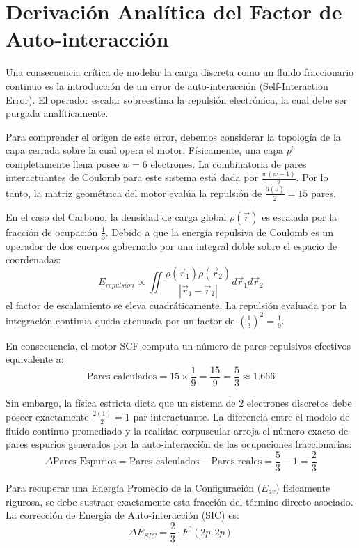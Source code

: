 \documentclass[11pt, a4paper]{article}
\begin{document}
\section{Derivación Analítica del Factor de Auto-interacción}
Una consecuencia crítica de modelar la carga discreta como un fluido fraccionario continuo es la introducción de un error de auto-interacción (Self-Interaction Error). El operador escalar sobreestima la repulsión electrónica, la cual debe ser purgada analíticamente.

Para comprender el origen de este error, debemos considerar la topología de la capa cerrada sobre la cual opera el motor. Físicamente, una capa $p^6$ completamente llena posee $w=6$ electrones. La combinatoria de pares interactuantes de Coulomb para este sistema está dada por $\frac{w(w-1)}{2}$. Por lo tanto, la matriz geométrica del motor evalúa la repulsión de $\frac{6(5)}{2} = 15$ pares.

En el caso del Carbono, la densidad de carga global $\rho(\vec{r})$ es escalada por la fracción de ocupación $\frac{1}{3}$. Debido a que la energía repulsiva de Coulomb es un operador de dos cuerpos gobernado por una integral doble sobre el espacio de coordenadas:
\[ E_{repulsi\acute{o}n} \propto \iint \frac{\rho(\vec{r}_1)\rho(\vec{r}_2)}{|\vec{r}_1 - \vec{r}_2|} d\vec{r}_1 d\vec{r}_2 \]
el factor de escalamiento se eleva cuadráticamente. La repulsión evaluada por la integración continua queda atenuada por un factor de $\left(\frac{1}{3}\right)^2 = \frac{1}{9}$.

En consecuencia, el motor SCF computa un número de pares repulsivos efectivos equivalente a:
\[ \text{Pares calculados} = 15 \times \frac{1}{9} = \frac{15}{9} = \frac{5}{3} \approx 1.666 \]

Sin embargo, la física estricta dicta que un sistema de $2$ electrones discretos debe poseer exactamente $\frac{2(1)}{2} = 1$ par interactuante. La diferencia entre el modelo de fluido continuo promediado y la realidad corpuscular arroja el número exacto de pares espurios generados por la auto-interacción de las ocupaciones fraccionarias:
\[ \Delta \text{Pares Espurios} = \text{Pares calculados} - \text{Pares reales} = \frac{5}{3} - 1 = \frac{2}{3} \]

Para recuperar una Energía Promedio de la Configuración ($E_{av}$) físicamente rigurosa, se debe sustraer exactamente esta fracción del término directo asociado. La corrección de Energía de Auto-interacción (SIC) es:
\[ \Delta E_{SIC} = \frac{2}{3} \cdot F^0(2p, 2p) \]
\end{document}
